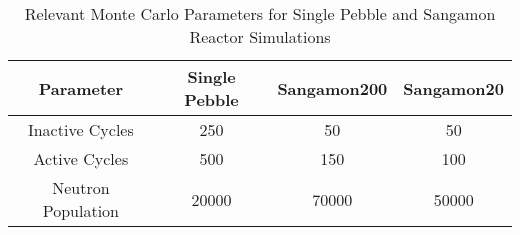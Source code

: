 \begin{table}[h!]
\centering
\caption{Relevant Monte Carlo Parameters for Single Pebble and Sangamon Reactor Simulations}
\begin{tabular}{ c  c  c  c }
\hline
Parameter & Single Pebble & Sangamon200 & Sangamon20 \\
\hline
Inactive Cycles & 250 & 50 & 50  \\
Active Cycles & 500 & 150 & 100 \\
Neutron Population & 20000 & 70000 & 50000 \\
\hline
\end{tabular}

\label{table:run-params}
\end{table}
